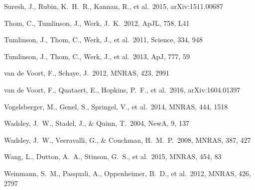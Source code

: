 \documentclass[useAMS,usenatbib]{mn2e}
\def \apj {ApJ}
\def \apjl {ApJL}
\def \mnras {MNRAS}
\def \na {NewA}
\begin{document}
\begin{thebibliography}{}
%
 Suresh, J., Rubin, K.~H.~R., Kannan, R., et al.\ 2015, arXiv:1511.00687


Thom, C., Tumlinson, J., Werk, J.~K.\ 2012, \apjl, 758, L41

 Tumlinson, J., Thom, C., Werk, J., et al.\ 2011, Science, 334, 948

 Tumlinson, J., Thom, C., Werk, J., et al.\ 2013, \apj, 777, 59


 van de Voort, F., Schaye, J.\ 2012, \mnras, 423, 2991

 van de Voort, F., Quataert, E., Hopkins, P.~F., et al.\ 2016, arXiv:1604.01397

 Vogelsberger, M., 
Genel, S., Springel, V., et al.\ 2014, \mnras, 444, 1518 



 Wadsley, J.~W., Stadel, 
J., \& Quinn, T.\ 2004, \na, 9, 137 

 Wadsley, J.~W., 
Veeravalli, G., \& Couchman, H.~M.~P.\ 2008, \mnras, 387, 427 

 Wang, L., Dutton, A.~A.,  Stinson, G.~S., et al.\ 2015, \mnras, 454, 83

   Weinmann, S.~M., Pasquali, A., Oppenheimer, B.~D., et al.\ 2012, \mnras, 426, 2797 


\end{thebibliography}
\end{document}

